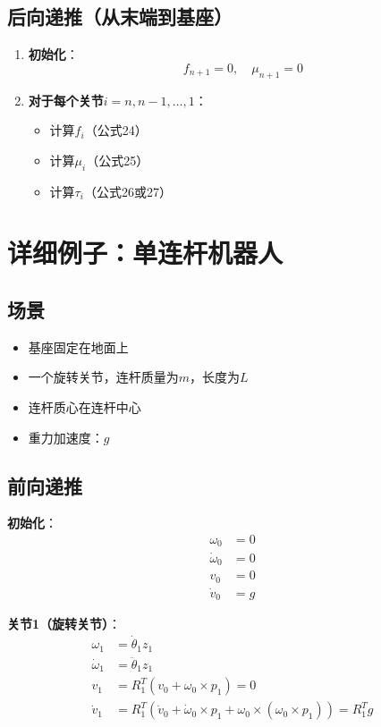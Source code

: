 \documentclass[12pt,a4paper]{article}
\begin{document}
\subsection{后向递推（从末端到基座）}

\begin{enumerate}
\item \textbf{初始化}：
\begin{equation}
f_{n+1} = 0, \quad \mu_{n+1} = 0
\end{equation}

\item \textbf{对于每个关节$i = n, n-1, \ldots, 1$}：
\begin{itemize}
\item 计算$f_i$（公式24）
\item 计算$\mu_i$（公式25）
\item 计算$\tau_i$（公式26或27）
\end{itemize}
\end{enumerate}

\section{详细例子：单连杆机器人}

\subsection{场景}

\begin{itemize}
\item 基座固定在地面上
\item 一个旋转关节，连杆质量为$m$，长度为$L$
\item 连杆质心在连杆中心
\item 重力加速度：$g$
\end{itemize}

\subsection{前向递推}

\textbf{初始化}：
\begin{align}
\omega_0 &= 0 \\
\dot{\omega}_0 &= 0 \\
v_0 &= 0 \\
\dot{v}_0 &= g
\end{align}

\textbf{关节1（旋转关节）}：
\begin{align}
\omega_1 &= \dot{\theta}_1 z_1 \\
\dot{\omega}_1 &= \ddot{\theta}_1 z_1 \\
v_1 &= R_1^T (v_0 + \omega_0 \times p_1) = 0 \\
\dot{v}_1 &= R_1^T (\dot{v}_0 + \dot{\omega}_0 \times p_1 + \omega_0 \times (\omega_0 \times p_1)) = R_1^T g
\end{align}
\end{document}
